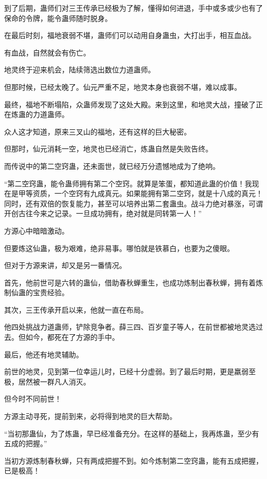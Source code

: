 \begin{this_body}
到了后期，蛊师们对三王传承已经极为了解，懂得如何进退，手中或多或少也有了保命的令牌，能令蛊师随时脱身。

在最后时刻，福地衰弱不堪，蛊师们可以动用自身蛊虫，大打出手，相互血战。

有血战，自然就会有伤亡。

地灵终于迎来机会，陆续筛选出数位力道蛊师。

但那时候，已经太晚了。仙元严重不足，地灵本身也衰弱不堪，难以成事。

最终，福地不断塌陷，众蛊师发现了这处大殿。来到这里，和地灵大战，撞破了正在炼蛊的力道蛊师。

众人这才知道，原来三叉山的福地，还有这样的巨大秘密。

但那时，仙元消耗一空，地灵也已经消亡，炼蛊自然是失败告终。

而传说中的第二空窍蛊，还未面世，就已经万分遗憾地成为了绝响。

“第二空窍蛊，能令蛊师拥有第二个空窍。就算是笨蛋，都知道此蛊的价值！我现在是甲等资质，一个空窍有九成真元。如果能拥有第二空窍，就是十八成的真元！同时，还有双倍的恢复能力，甚至可以培养出第二套蛊虫。战斗力绝对暴涨，可谓开创古往今来之记录。一旦成功拥有，绝对就是同转第一人！”

方源心中暗暗激动。

但要炼这仙蛊，极为艰难，绝非易事。哪怕就是铁慕白，也要为之傻眼。

但对于方源来讲，却又是另一番情况。

首先，他前世可是六转的蛊仙，借助春秋蝉重生，也成功炼制出春秋蝉，拥有着炼制仙蛊的宝贵经验。

其次，三王传承开启以来，他就一直在布局。

他四处挑战力道蛊师，铲除竞争者。薛三四、百岁童子等人，在前世都被地灵选过去。但如今，都死在了方源的手中。

最后，他还有地灵辅助。

前世的地灵，见到第一位幸运儿时，已经十分虚弱。到了最后时期，更是羸弱至极，居然被一群凡人消灭。

但今时不同前世！

方源主动寻死，提前到来，必将得到地灵的巨大帮助。

“当初那蛊仙，为了炼蛊，早已经准备充分。在这样的基础上，我再炼蛊，至少有五成的把握。”

当初方源炼制春秋蝉，只有两成把握不到。如今炼制第二空窍蛊，能有五成把握，已是极高！

\end{this_body}

